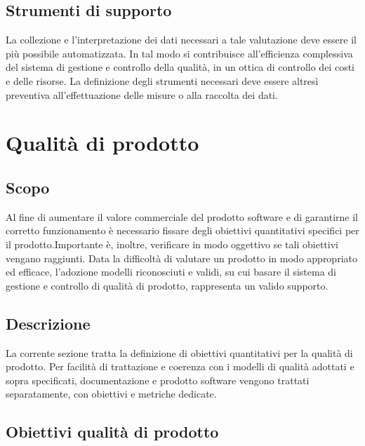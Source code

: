 \documentclass[12pt,a4paper]{article}
\begin{document}
\subsection{Strumenti di supporto}
La collezione e l'interpretazione dei dati necessari a tale valutazione deve essere il più possibile automatizzata. In tal modo si contribuisce all'efficienza complessiva del sistema di gestione e controllo della qualità, in un ottica di controllo dei costi e delle risorse.
La definizione degli strumenti necessari deve essere altresì preventiva all'effettuazione delle misure o alla raccolta dei dati.


\section{Qualità di prodotto}
\subsection{Scopo}
Al fine di aumentare il valore commerciale del prodotto software e di garantirne il corretto funzionamento è necessario fissare degli obiettivi quantitativi specifici per il prodotto.Importante è, inoltre, verificare in modo oggettivo se tali obiettivi vengano raggiunti. Data la difficoltà di valutare un prodotto in modo appropriato ed efficace, l'adozione modelli riconosciuti e validi, su cui basare il sistema di gestione e controllo di qualità di prodotto, rappresenta un valido supporto.

\subsection{Descrizione}
La corrente sezione tratta la definizione di obiettivi quantitativi per la qualità di prodotto. 
Per facilità di trattazione e coerenza con i modelli di qualità adottati e sopra specificati, documentazione e prodotto software vengono trattati separatamente, con obiettivi e metriche dedicate.


\subsection{Obiettivi qualità di prodotto}
\end{document}
